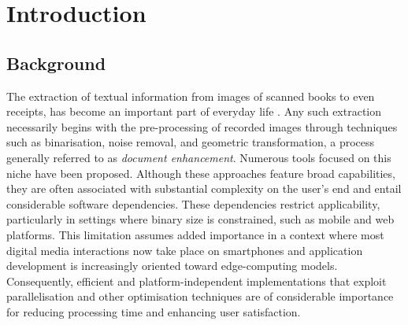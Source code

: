 \documentclass[sigconf]{acmart}
\begin{document}
\section{Introduction}
\label{sec:intro}

\subsection{Background}
\label{sec:background}

The extraction of textual information from images of scanned books to even receipts, has become an important part of everyday life \cite{alqudah_2015,review_degradation_image_enhancement_zhou_2023}. Any such extraction necessarily begins with the pre-processing of recorded images through techniques such as binarisation, noise removal, and geometric transformation, a process generally referred to as \textit{document enhancement}. Numerous tools focused on this niche have been proposed. Although these approaches feature broad capabilities, they are often associated with substantial complexity on the user's end and entail considerable software dependencies. These dependencies restrict applicability, particularly in settings where binary size is constrained, such as mobile and web platforms. This limitation assumes added importance in a context where most digital media interactions now take place on smartphones and application development is increasingly oriented toward edge-computing models. Consequently, efficient and platform-independent implementations that exploit parallelisation and other optimisation techniques are of considerable importance for reducing processing time and enhancing user satisfaction.
\end{document}
